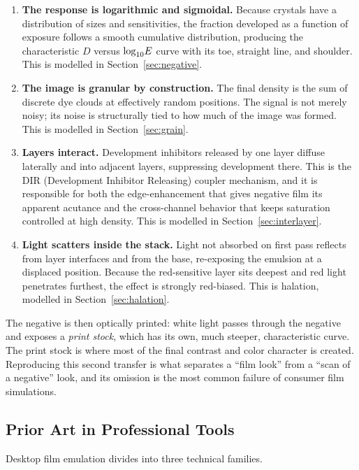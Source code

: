 \begin{enumerate}
\item \textbf{The response is logarithmic and sigmoidal.} Because
crystals have a distribution of sizes and sensitivities, the fraction developed
as a function of exposure follows a smooth cumulative distribution, producing
the characteristic $D$ versus $\log_{10}\!E$ curve with its toe, straight line, and
shoulder. This is modelled in Section~\ref{sec:negative}.
\item \textbf{The image is granular by construction.} The final density is
the sum of discrete dye clouds at effectively random positions. The signal is
not merely noisy; its noise is structurally tied to how much of the image was
formed. This is modelled in Section~\ref{sec:grain}.
\item \textbf{Layers interact.} Development inhibitors released by one layer
diffuse laterally and into adjacent layers, suppressing development there. This
is the DIR (Development Inhibitor Releasing) coupler mechanism, and it is
responsible for both the edge-enhancement that gives negative film its apparent
acutance and the cross-channel behavior that keeps saturation controlled at
high density. This is modelled in Section~\ref{sec:interlayer}.
\item \textbf{Light scatters inside the stack.} Light not absorbed on first
pass reflects from layer interfaces and from the base, re-exposing the emulsion
at a displaced position. Because the red-sensitive layer sits deepest and red
light penetrates furthest, the effect is strongly red-biased. This is halation,
modelled in Section~\ref{sec:halation}.
\end{enumerate}

The negative is then optically printed: white light passes through the negative
and exposes a \emph{print stock}, which has its own, much steeper,
characteristic curve. The print stock is where most of the final contrast and
color character is created. Reproducing this second transfer is what separates
a ``film look'' from a ``scan of a negative'' look, and its omission is the
most common failure of consumer film simulations.

\subsection{Prior Art in Professional Tools}

Desktop film emulation divides into three technical families.

